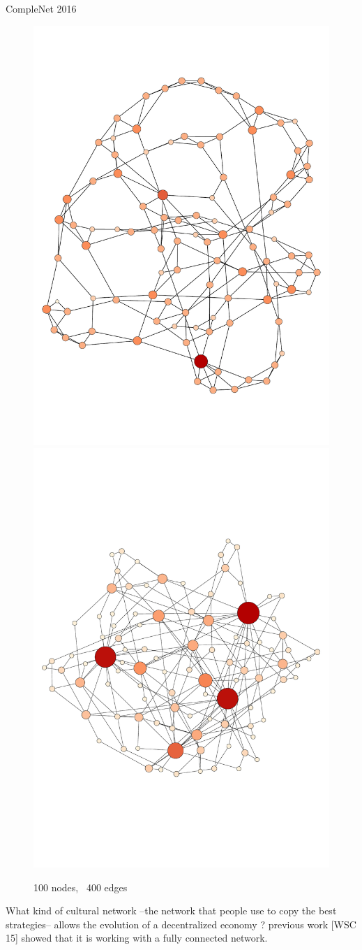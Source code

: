 \documentclass[9pt, handout=show,notes=show]{beamer}
\begin{document}
\begin{frame}{CompleNet 2016}
    \begin{figure}
	\includegraphics[width=.4\textwidth]{images/smallworld.pdf}
	\includegraphics[width=.4\textwidth]{images/scalefree.pdf}
	\caption{100 nodes, ~400 edges}
    \end{figure}

    What kind of cultural network --the network that people use to copy the best strategies-- allows the evolution of a decentralized  economy ? previous work [WSC 15] showed that it is working with a fully connected network.
    
\end{frame}
\end{document}
